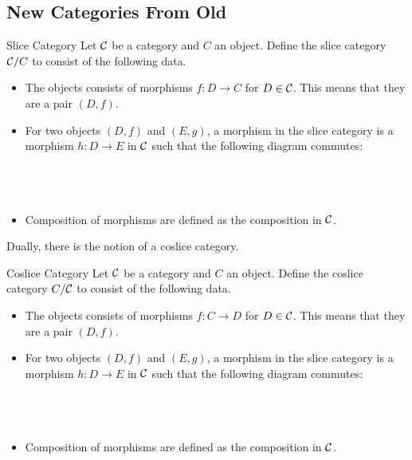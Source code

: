 \documentclass[a4paper]{article}
\begin{document}
\subsection{New Categories From Old}
\begin{defn}{Slice Category}{} Let $\mathcal{C}$ be a category and $C$ an object. Define the slice category $\mathcal{C}/C$ to consist of the following data. 
\begin{itemize}
\item The objects consists of morphisms $f:D\to C$ for $D\in\mathcal{C}$. This means that they are a pair $(D,f)$. 
\item For two objects $(D,f)$ and $(E,g)$, a morphism in the slice category is a morphism $h:D\to E$ in $\mathcal{C}$ such that the following diagram commutes: \\~\\
\\~\\
\item Composition of morphisms are defined as the composition in $\mathcal{C}$. 
\end{itemize}
\end{defn}

Dually, there is the notion of a coslice category. 

\begin{defn}{Coslice Category}{} Let $\mathcal{C}$ be a category and $C$ an object. Define the coslice category $C/\mathcal{C}$ to consist of the following data. 
\begin{itemize}
\item The objects consists of morphisms $f:C\to D$ for $D\in\mathcal{C}$. This means that they are a pair $(D,f)$. 
\item For two objects $(D,f)$ and $(E,g)$, a morphism in the slice category is a morphism $h:D\to E$ in $\mathcal{C}$ such that the following diagram commutes: \\~\\
\\~\\
\item Composition of morphisms are defined as the composition in $\mathcal{C}$. 
\end{itemize}
\end{defn}
\end{document}
